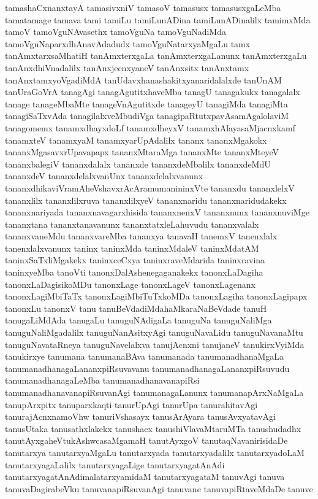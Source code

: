 {tamashaCxnanxtayA
tamasivxniV
tamasoV
tamasusx
tamasusxgaLeMba
tamatamage
tamava
tami
tamiLu
tamiLunADina
tamiLunADinalilx
tamimxMda
tamoV
tamoVguNAvasethx
tamoVguNa
tamoVguNadiMda
tamoVguNaparxdhAnavAdadudx
tamoVguNatarxyaMgaLu
tamx
tanAmxtarxsaMhatiH
tanAmxterxgaLa
tanAmxterxgaLanunx
tanAmxterxgaLu
tanAnxdhiVnadalilx
tanAnxjecnxyaneV
tanAnxsitx
tanAnxtamx
tanAnxtamxyoVgadiMdA
tanUdavxhanashakitxyanaridalalxde
tanUnAM
tanUraGoVrA
tanagAgi
tanagAgutitxhaveMba
tanagU
tanagakukx
tanagalalx
tanage
tanageMbaMte
tanageVnAgutitxde
tanageyU
tanagiMda
tanagiMta
tanagiSaTxvAda
tanagilalxveMbudiVga
tanagipaRtutxpavAsamAgalolaviM
tanagomemx
tanamxdhayxdoLf
tanamxdheyxV
tanamxhAlayasaMjacnxkamf
tanamxteV
tanamxyaM
tanamxyarUpAdalilx
tananx
tananxMgakokx
tananxMgasavxrUpavapapx
tananxMtaraMga
tananxMte
tananxMteyeV
tananxbalegiV
tananxdalalx
tananxde
tananxdeMbalilx
tananxdeMdU
tananxdeV
tananxdelalxvanUnx
tananxdelalxvanunx
tananxdhikaviVramAheVshavxrAcAramumanininxVte
tananxdu
tananxlelxV
tananxlilx
tananxlilxruva
tananxlilxyeV
tananxnaridu
tananxnaridudakekx
tananxnariyada
tananxnavagarxhisida
tananxnenxV
tananxnunx
tananxnuviMge
tananxtana
tananxtanavanunx
tananxtatxleLahuvudu
tananxvalalx
tananxvaneMdu
tananxvareMba
tananxya
tanavaH
tanemxV
tanenxlalx
tanenxlalxvanunx
taninx
taninxMda
taninxMdaleV
taninxMdatAM
taninxSaTxliMgakekx
taninxceCxya
taninxraveMdarida
taninxravina
taninxyeMba
tanoVti
tanonxDalAshenegaganakekx
tanonxLaDagiha
tanonxLaDagisikoMDu
tanonxLage
tanonxLageV
tanonxLagenanx
tanonxLagiMbiTaTx
tanonxLagiMbiTuTxkoMDa
tanonxLagiha
tanonxLagipapx
tanonxLu
tanonxV
tanu
tanuBeVdadiMdahaMkaraNaBeVdade
tanuH
tanugaLiMdAda
tanugaLu
tanuguNAdigaLa
tanuguNa
tanuguNaliMga
tanuguNaliMgadalilx
tanuguNanAsitxyAgi
tanuguNavaLidu
tanuguNavanaMtu
tanuguNavataRneya
tanuguNavelalxva
tanujAcnxni
tanujaneV
tanukirxVyiMda
tanukirxye
tanumana
tanumanaBAva
tanumanada
tanumanadhanaMgaLa
tanumanadhanagaLananxpiRsuvavanu
tanumanadhanagaLananxpiRsuvudu
tanumanadhanagaLeMba
tanumanadhanavanapiRsi
tanumanadhanavanapiRsuvanAgi
tanumanagaLanunx
tanumanapArxNaMgaLa
tanupArxpitx
tanuparxkaqti
tanurUpAgi
tanurUpa
tanurahitavAgi
tanurajAcnxnamoVhw
tanuriVshasayx
tanusArAyara
tanusAvxyatavAgi
tanusUtaka
tanusathxlakekx
tanushacx
tanushiVlavaMtaruMTa
tanushudadhx
tanutAyxgaheVtukAshwcasaMgamaH
tanutAyxgoV
tanutaqNavanirisidaDe
tanutarxya
tanutarxyaMgaLu
tanutarxyada
tanutarxyadalilx
tanutarxyadoLaM
tanutarxyagaLalilx
tanutarxyagaLige
tanutarxyagatAnAdi
tanutarxyagatAnAdimalatarxyamidaM
tanutarxyagataM
tanuvAgi
tanuva
tanuvaDagirabeVku
tanuvanapiRsuvanAgi
tanuvane
tanuvapiRtaveMdaDe
tanuve
}
